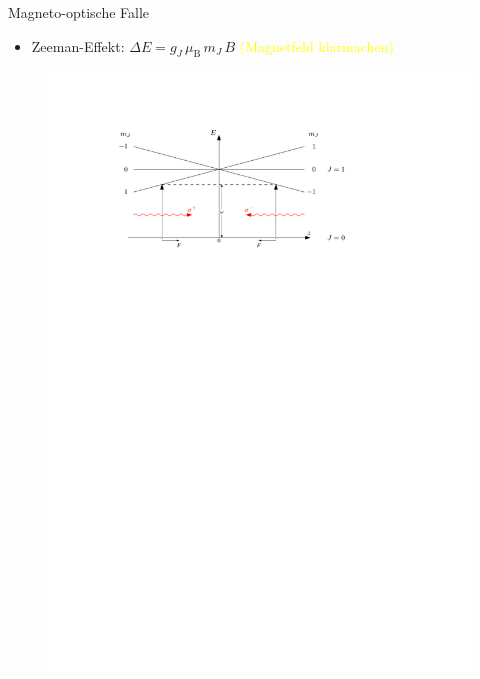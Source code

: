 \documentclass[12pt,xcolor=dvipsnames]{beamer}
\newcommand{\korr}[1]{{\textcolor{Yellow}{(#1)}}}
\begin{document}
\begin{frame}{Magneto-optische Falle}
\begin{itemize}
	\item Zeeman-Effekt: $\Delta E = g_J \, \mu_\mathrm{B} \, m_J \, B$ \korr{Magnetfeld klarmachen}
\end{itemize}

\vspace{0.5cm}

\begin{figure}[h]
	\centering
	\includegraphics[width=1\textwidth]{./figures/mot.pdf}
\end{figure}
\end{frame}
\end{document}
